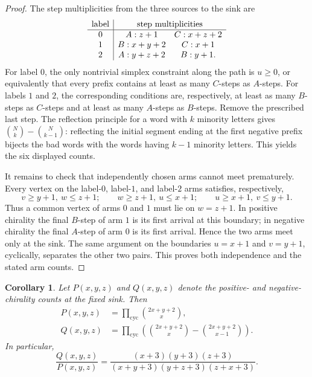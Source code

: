\documentclass[11pt]{amsart}
\newtheorem{corollary}[theorem]{Corollary}
\theoremstyle{definition}
\begin{document}
\begin{proof}
The step multiplicities from the three sources to the sink are
\[
\begin{array}{c|cc}
\text{label}&\multicolumn{2}{c}{\text{step multiplicities}}\\ \hline
0&A:z+1&C:x+z+2\\
1&B:x+y+2&C:x+1\\
2&A:y+z+2&B:y+1.
\end{array}
\]
For label $0$, the only nontrivial simplex constraint along the path is
$u\geq0$, or equivalently that every prefix contains at least as many
$C$-steps as $A$-steps.  For labels $1$ and $2$, the corresponding conditions
are, respectively, at least as many $B$-steps as $C$-steps and at least as
many $A$-steps as $B$-steps.  Remove the prescribed last step.  The reflection
principle for a word with $k$ minority letters gives
$\binom Nk-\binom N{k-1}$: reflecting the initial segment ending at the first
negative prefix bijects the bad words with the words having $k-1$ minority
letters.  This yields the six displayed counts.

It remains to check that independently chosen arms cannot meet prematurely.
Every vertex on the label-$0$, label-$1$, and label-$2$ arms satisfies,
respectively,
\[
 v\geq y+1,\ w\leq z+1;\qquad
 w\geq z+1,\ u\leq x+1;\qquad
 u\geq x+1,\ v\leq y+1.
\]
Thus a common vertex of arms $0$ and $1$ must lie on $w=z+1$.  In positive
chirality the final $B$-step of arm $1$ is its first arrival at this boundary;
in negative chirality the final $A$-step of arm $0$ is its first arrival.
Hence the two arms meet only at the sink.  The same argument on the boundaries
$u=x+1$ and $v=y+1$, cyclically, separates the other two pairs.  This proves
both independence and the stated arm counts.
\end{proof}

\begin{corollary}\label{cor:fixed-sink}
Let $P(x,y,z)$ and $Q(x,y,z)$ denote the positive- and negative-chirality
counts at the fixed sink.  Then
\begin{align}
 P(x,y,z)
 &=\prod_{\mathrm{cyc}}\binom{2x+y+2}{x},\label{eq:Pxyz}\\
 Q(x,y,z)
 &=\prod_{\mathrm{cyc}}
 \left(\binom{2x+y+2}{x}-\binom{2x+y+2}{x-1}\right).\label{eq:Qxyz}
\end{align}
In particular,
\begin{equation}\label{eq:QoverP}
 \frac{Q(x,y,z)}{P(x,y,z)}
 =\frac{(x+3)(y+3)(z+3)}
 {(x+y+3)(y+z+3)(z+x+3)}.
\end{equation}
\end{corollary}
\end{document}
